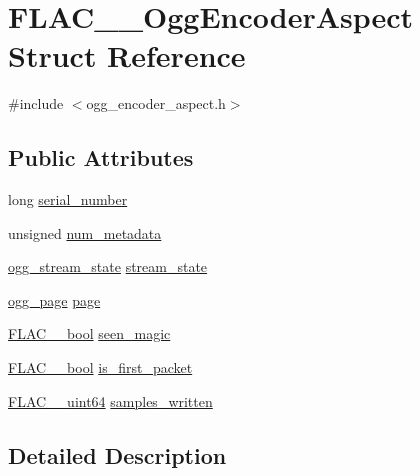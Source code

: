 \hypertarget{struct_f_l_a_c_____ogg_encoder_aspect}{}\section{F\+L\+A\+C\+\_\+\+\_\+\+Ogg\+Encoder\+Aspect Struct Reference}
\label{struct_f_l_a_c_____ogg_encoder_aspect}


{\ttfamily \#include $<$ogg\+\_\+encoder\+\_\+aspect.\+h$>$}

\subsection*{Public Attributes}
\begin{DoxyCompactItemize}
\item 
long \hyperlink{struct_f_l_a_c_____ogg_encoder_aspect_a89e40d82a35841dcfb5866f4eee98d5c}{serial\+\_\+number}
\item 
unsigned \hyperlink{struct_f_l_a_c_____ogg_encoder_aspect_a5badb1285a2ad175eb0756c859d83b82}{num\+\_\+metadata}
\item 
\hyperlink{structogg__stream__state}{ogg\+\_\+stream\+\_\+state} \hyperlink{struct_f_l_a_c_____ogg_encoder_aspect_af973367ff9fcf024230035659520d199}{stream\+\_\+state}
\item 
\hyperlink{structogg__page}{ogg\+\_\+page} \hyperlink{struct_f_l_a_c_____ogg_encoder_aspect_aba765d0dd53b767f2f633c871ba73276}{page}
\item 
\hyperlink{ordinals_8h_a95103469f1cbd78b8cf250194985b34e}{F\+L\+A\+C\+\_\+\+\_\+bool} \hyperlink{struct_f_l_a_c_____ogg_encoder_aspect_a75cfe6c22e1b1d561108fc8ce383c0ef}{seen\+\_\+magic}
\item 
\hyperlink{ordinals_8h_a95103469f1cbd78b8cf250194985b34e}{F\+L\+A\+C\+\_\+\+\_\+bool} \hyperlink{struct_f_l_a_c_____ogg_encoder_aspect_a6ada35274f264bd7721dcebc39da1d05}{is\+\_\+first\+\_\+packet}
\item 
\hyperlink{ordinals_8h_aa78c8c70a3eb8a58af7436f278acde8e}{F\+L\+A\+C\+\_\+\+\_\+uint64} \hyperlink{struct_f_l_a_c_____ogg_encoder_aspect_afa019d3fb68ad30b8c7587b6d0997df3}{samples\+\_\+written}
\end{DoxyCompactItemize}


\subsection{Detailed Description}


